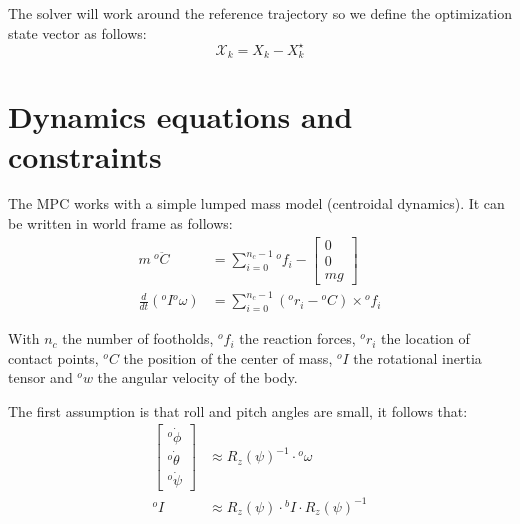 \documentclass[a4paper,11pt]{article}
\begin{document}
The solver will work around the reference trajectory so we define the optimization state vector as follows:
\begin{equation}\mathcal{X}_k = X_k - X_k^\star \end{equation}

\newpage
\section{Dynamics equations and constraints}

The MPC works with a simple lumped mass model (centroidal dynamics). It can be written in world frame as follows:
\begin{align}
	m ~ {}^o\!  \ddot C &= \sum_{i=0}^{n_c - 1} {}^o\!f_i - \begin{bmatrix} 0 \\ 0 \\ mg \end{bmatrix} \label{eq:c_linear}\\
	\frac{d}{dt}({}^o\!I {}^o\!\omega) &= \sum_{i=0}^{n_c - 1} ({}^o\!r_i - {}^o\!C) \times {}^o\!f_i \label{eq:c_angular}
\end{align}

With $n_c$ the number of footholds, ${}^o\!f_i$ the reaction forces, ${}^o\!r_i$ the location of contact points, ${}^o\!C$ the position of the center of mass, ${}^o\!I$ the rotational inertia tensor and ${}^o\!w$ the angular velocity of the body.

The first assumption is that roll and pitch angles are small, it follows that:
\begin{align}
\begin{bmatrix} {}^o\! \dot \phi \\ {}^o\! \dot \theta \\ {}^o\! \dot \psi \end{bmatrix} &\approx R_z(\psi)^{-1} \cdot {}^o\!\omega \label{eq:assumption1} \\ 
{}^o\! I &\approx R_z(\psi) \cdot {}^b\! I \cdot R_z(\psi)^{-1} 
\end{align}
\end{document}
